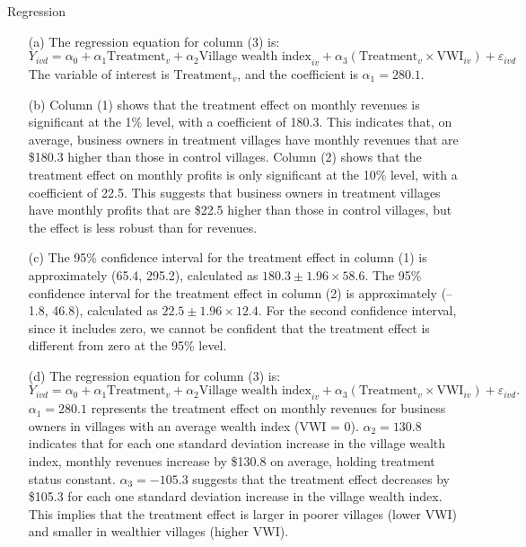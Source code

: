 \begin{homeworkProblem}{Regression}
\begin{solution}
        \begin{itemize}
            \item[(a)] The regression equation for column (3) is:
                \[
                    Y_{ivd} = \alpha_0 + \alpha_1 \text{Treatment}_{v} + 
                    \alpha_2 \text{Village wealth index}_{iv} + 
                    \alpha_3 \left( \text{Treatment}_{v} \times 
                    \text{VWI}_{iv} \right) + \varepsilon_{ivd}
                \]
                The variable of interest is $\text{Treatment}_v$, and the
                coefficient is $\alpha_1 = 280.1$.
            \item[(b)] Column (1) shows that the treatment effect on monthly
                revenues is significant at the 1\% level, with a coefficient
                of 180.3. This indicates that, on average, business owners in
                treatment villages have monthly revenues that are \$180.3
                higher than those in control villages. Column (2) shows that
                the treatment effect on monthly profits is only significant at
                the 10\% level, with a coefficient of 22.5. This suggests that
                business owners in treatment villages have monthly profits that
                are \$22.5 higher than those in control villages, but the effect
                is less robust than for revenues.
            \item[(c)] The 95\% confidence interval for the treatment effect in
                column (1) is approximately (65.4, 295.2), calculated as
                $180.3 \pm 1.96 \times 58.6$. The 95\% confidence interval for
                the treatment effect in column (2) is approximately (–1.8, 46.8),
                calculated as $22.5 \pm 1.96 \times 12.4$. For the second 
                confidence interval, since it includes zero, we cannot be confident
                that the treatment effect is different from zero at the 95\% level.
            \item[(d)] The regression equation for column (3) is:
                \[
                    Y_{ivd} = \alpha_0 + \alpha_1 \text{Treatment}_{v} + 
                    \alpha_2 \text{Village wealth index}_{iv} + 
                    \alpha_3 \left( \text{Treatment}_{v} \times 
                    \text{VWI}_{iv} \right) + \varepsilon_{ivd}.
                \]
                $\alpha_1 = 280.1$ represents the treatment effect on
                monthly revenues for business owners in villages with an
                average wealth index (VWI = 0). $\alpha_2 = 130.8$ indicates
                that for each one standard deviation increase in the village
                wealth index, monthly revenues increase by \$130.8 on average,
                holding treatment status constant. $\alpha_3 = -105.3$ suggests
                that the treatment effect decreases by \$105.3 for each one
                standard deviation increase in the village wealth index. This
                implies that the treatment effect is larger in poorer villages
                (lower VWI) and smaller in wealthier villages (higher VWI). \\


\end{itemize}
\end{solution}
\end{homeworkProblem}
